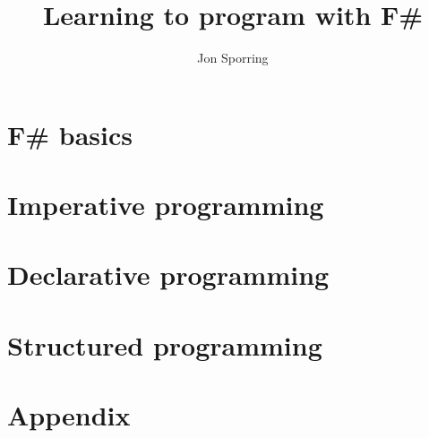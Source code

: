 \documentclass{report}
\title{Learning to program with F\#}
\author{Jon Sporring}
\begin{document}
\begin{titlepage}
\maketitle
\thispagestyle{empty}
\end{titlepage}

\tableofcontents





\part{F\# basics}
\label{part:basics}












\part{Imperative programming}
\label{part:imperative}













\part{Declarative programming}
\label{part:declarative}



\part{Structured programming}
\label{part:structured}



\part{Appendix}
\label{part:appendix}
\appendix






\clearpage
{}



\clearpage
{}
\printindex
\end{document}

